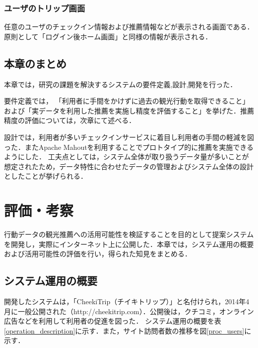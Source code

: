 \documentclass{jsarticle}
\begin{document}
\subsubsection{ユーザのトリップ画面}

任意のユーザのチェックイン情報および推薦情報などが表示される画面である．原則として「ログイン後ホーム画面」と同様の情報が表示される．

\subsection{本章のまとめ}

本章では，研究の課題を解決するシステムの要件定義,設計,開発を行った．

要件定義では， 「利用者に手間をかけずに過去の観光行動を取得できること」および「実データを利用した推薦を実施し精度を評価すること」を挙げた．推薦精度の評価については，次章にて述べる．

設計では，利用者が多いチェックインサービスに着目し利用者の手間の軽減を図った．またApache Mahoutを利用することでプロトタイプ的に推薦を実施できるようにした． 工夫点としては，システム全体が取り扱うデータ量が多いことが想定されたため，データ特性に合わせたデータの管理およびシステム全体の設計としたことが挙げられる．


\newpage

\section{評価・考察}

行動データの観光推薦への活用可能性を検証することを目的として提案システムを開発し，実際にインターネット上に公開した．本章では，システム運用の概要および活用可能性の評価を行い，得られた知見をまとめる．

\subsection{システム運用の概要}

開発したシステムは，「CheekiTrip（チイキトリップ）」と名付けられ，2014年4月に一般公開された（http://cheekitrip.com）．公開後は，クチコミ，オンライン広告などを利用して利用者の促進を図った．
システム運用の概要を表\ref{operation_description}に示す．また，サイト訪問者数の推移を図\ref{proc_users}に示す．
\end{document}
